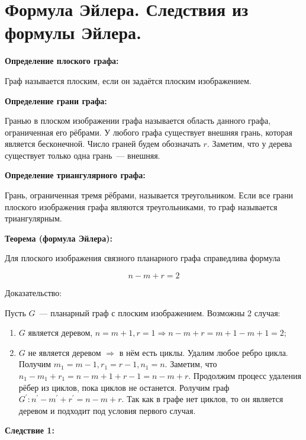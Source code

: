\section{Формула Эйлера. Следствия из формулы Эйлера.}

\textbf{Определение плоского графа:}
    \smallskip

    Граф называется плоским, если он задаётся плоским изображением.
    \bigskip

\textbf{Определение грани графа:}    
    \smallskip

    Гранью в плоском изображении графа называется область данного графа,
    ограниченная его рёбрами. У любого графа существует внешняя грань,
    которая является бесконечной. Число граней будем обозначать $r$. Заметим,
    что у дерева существует только одна грань~--- внешняя.
    \bigskip

\textbf{Определение триангулярного графа:}
    \smallskip
    
    Грань, ограниченная тремя рёбрами, называется треугольником. Если все грани
    плоского изображения графа являются треугольниками, то граф называется
    триангулярным.
    \bigskip

\textbf{Теорема (формула Эйлера):}
    \smallskip
    
    Для плоского изображения связного планарного графа справедлива формула

    \[
        n - m + r = 2  
    \]
    \bigskip

    Доказательство:
    \bigskip

    Пусть $G$~--- планарный граф с плоским изображением. Возможны 2 случая:

    \begin{enumerate}
        \item{$G$ является деревом, $n = m + 1, r = 1 \Rightarrow n - m + r =
        m + 1 - m + 1 = 2$;}
        \item{$G$ не является деревом $\Rightarrow$ в нём есть циклы. Удалим
        любое ребро цикла. Получим $m_1 = m - 1, r_1 = r - 1, n_1 = n$. Заметим,
        что $n_1 - m_1 + r_1 = n - m + 1 + r - 1 = n - m + r$. Продолжим процесс 
        удаления рёбер из циклов, пока циклов не останется. Ролучим граф $G^{'}:
        n^{'} - m^{'} + r^{'} = n - m + r.$ Так как в графе нет циклов,
        то он является деревом и подходит под условия первого случая.}
    \end{enumerate}
    \bigskip

\textbf{Следствие 1:}
    \smallskip
    
